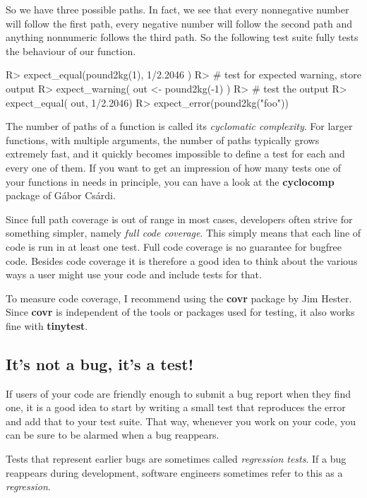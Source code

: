 \documentclass[11pt]{article}
\newcommand{\pkg}[1]{\textbf{#1}}
\begin{document}
So we have three possible paths. In fact, we see that every nonnegative number
will follow the first path, every negative number will follow the second path
and anything nonnumeric follows the third path. So the following test suite
fully tests the behaviour of our function.
\begin{Schunk}
\begin{Sinput}
R>     expect_equal(pound2kg(1), 1/2.2046  )
R>     # test for expected warning, store output
R>     expect_warning( out <- pound2kg(-1) )
R>     # test the output
R>     expect_equal( out, 1/2.2046)
R>     expect_error(pound2kg("foo"))
\end{Sinput}
\end{Schunk}

The number of paths of a function is called its \emph{cyclomatic complexity}.
For larger functions, with multiple arguments, the number of paths typically
grows extremely fast, and it quickly becomes impossible to define a test for
each and every one of them. If you want to get an impression of how many tests
one of your functions in needs in principle, you can have a look at the
\pkg{cyclocomp} package of G\'abor Cs\'ardi\cite{csardi2016cyclocomp}.

Since full path coverage is out of range in most cases, developers often strive
for something simpler, namely \emph{full code coverage}. This simply means that
each line of code is run in at least one test. Full code coverage is no
guarantee for bugfree code. Besides code coverage it is therefore a good idea
to think about the various ways a user might use your code and include tests
for that.

To measure code coverage, I recommend using the \pkg{covr} package by Jim
Hester\cite{hester2018covr}. Since \pkg{covr} is independent of the tools or
packages used for testing, it also works fine with \pkg{tinytest}.


\subsection{It's not a bug, it's a test!}
If users of your code are friendly enough to submit a bug report when they find
one, it is a good idea to start by writing a small test that reproduces the
error and add that to your test suite. That way, whenever you work on your
code, you can be sure to be alarmed when a bug reappears.

Tests that represent earlier bugs are sometimes called \emph{regression tests}.
If a bug reappears during development, software engineers sometimes refer
to this as a \emph{regression}.
\end{document}
